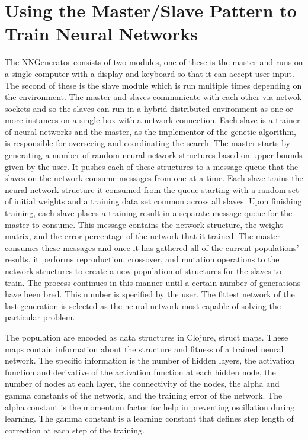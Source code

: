 \section{Using the Master/Slave Pattern to Train Neural Networks}
The NNGenerator consists of two modules, one of these is the master and runs on a single computer with a display and keyboard so that it can accept user input.
The second of these is the slave module which is run multiple times depending on the environment.
The master and slaves communicate with each other via netwok sockets and so the slaves can run in a hybrid distributed environment as one or more instances on a single box with a network connection. 
Each slave is a trainer of neural networks and the master, as the implementor of the genetic algorithm, is responsible for overseeing and coordinating the search.
The master starts by generating a number of random neural network structures based on upper bounds given by the user. 
It pushes each of these structures to a message queue that the slaves on the network consume messages from one at a time. 
Each slave trains the neural network structure it consumed from the queue starting with a random set of initial weights and a training data set common across all slaves. Upon finishing training, each slave places a training result in a separate message queue for the master to consume. 
This message contains the network structure, the weight matrix, and the error percentage of the network that it trained. 
The master consumes these messages and once it has gathered all of the current populations' results, it performs reproduction, crossover, and mutation operations to the network structures to create a new population of structures for the slaves to train. 
The process continues in this manner until a certain number of generations have been bred. 
This number is specified by the user. 
The fittest network of the last generation is selected as the neural network most capable of solving the particular problem.  

The population are encoded as data structures in Clojure, struct maps. 
These maps contain information about the structure and fitness of a trained neural network. 
The specific information is the number of hidden layers, the activation function and derivative of the activation function at each hidden node, the number of nodes at each layer, the connectivity of the nodes, the alpha and gamma constants of the network, and the training error of the network. 
The alpha constant is the momentum factor for help in preventing oscillation during learning. 
The gamma constant is a learning constant that defines step length of correction at each step of the training.

